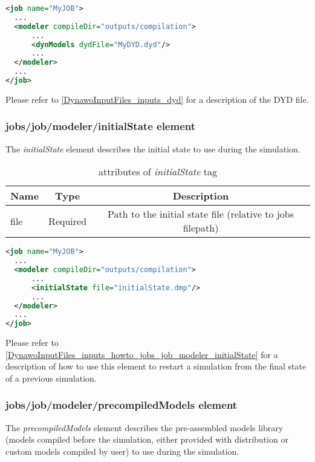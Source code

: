 \documentclass[a4paper, 12pt]{report}
\begin{document}
\begin{lstlisting}[language=XML, morekeywords={network}]
<job name="MyJOB">
  ...
  <modeler compileDir="outputs/compilation">
      ...
      <dynModels dydFile="MyDYD.dyd"/>
      ...
  </modeler>
  ...
</job>
\end{lstlisting}

Please refer to \ref{DynawoInputFiles_inputs_dyd} for a description of the DYD file.

\subsubsection{jobs/job/modeler/initialState element}
\label{DynawoInputFiles_inputs_jobs_job_modeler_initialState}

The \textit{initialState} element describes the initial state to use during the simulation.

\begin{table}[H]
\center
\begin{tabular}{ l | c | c }
\toprule
\textbf{{Name}} & \textbf{{Type}} & \textbf{{Description}}\\
\midrule
\rowcolor{white}
\small{file} & \small{Required} & \small{Path to the initial state file (relative to jobs filepath)}\\
\bottomrule
\end{tabular}
\caption{attributes of \textit{initialState} tag}
\end{table}

\begin{lstlisting}[language=XML, morekeywords={network}]
<job name="MyJOB">
  ...
  <modeler compileDir="outputs/compilation">
      ...
      <initialState file="initialState.dmp"/>
      ...
  </modeler>
  ...
</job>
\end{lstlisting}

Please refer to \ref{DynawoInputFiles_inputs_howto_jobs_job_modeler_initialState} for a description of how to use this element to restart a simulation from the final state of a previous simulation.

\subsubsection{jobs/job/modeler/precompiledModels element}
\label{DynawoInputFiles_inputs_jobs_job_modeler_precompiledModels}

The \textit{precompiledModels} element describes the pre-assembled models library (models compiled before the simulation, either provided with \Dynawo distribution or custom models compiled by user)
to use during the simulation.
\end{document}
